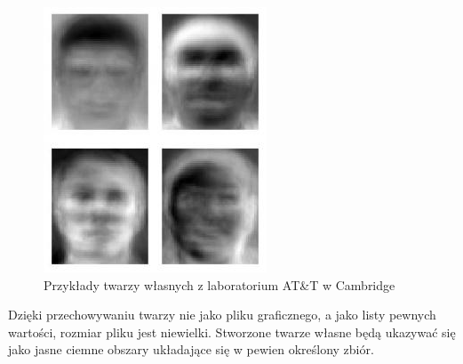 \begin{figure}[h]
\centering
\includegraphics[scale=0.5]{./eigenface.jpg}
\caption[Twarze własne, przykłady]{Przykłady twarzy własnych z laboratorium AT\&T w Cambridge}
\end{figure}

Dzięki przechowywaniu twarzy nie jako pliku graficznego, a jako listy pewnych wartości, rozmiar pliku jest niewielki. Stworzone twarze własne będą ukazywać się jako jasne  ciemne obszary układające się w pewien określony zbiór.

